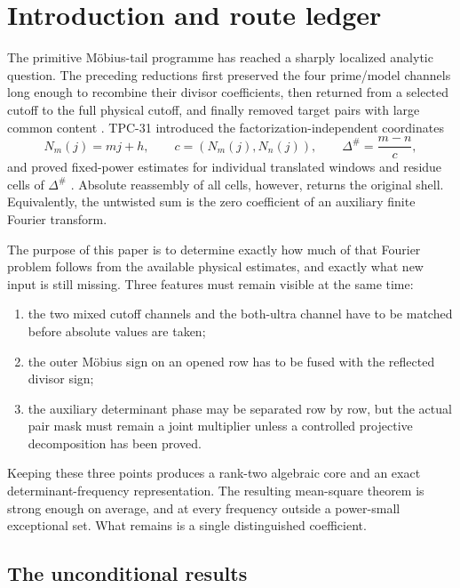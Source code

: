 \section{Introduction and route ledger}
\label{sec:tpc32-introduction}

The primitive M\"obius-tail programme has reached a sharply localized
analytic question.  The preceding reductions first preserved the four
prime/model channels long enough to recombine their divisor coefficients,
then returned from a selected cutoff to the full physical cutoff, and
finally removed target pairs with large common content
\citep{WangTPC19,WangTPC20,WangTPC25,WangTPC29,WangTPC30}.  TPC-31
introduced the factorization-independent coordinates
\begin{equation}
 N_m(j)=mj+h,
 \qquad
 c=(N_m(j),N_n(j)),
 \qquad
 \Delta^\#=\frac{m-n}{c},
 \label{eq:tpc32-intro-canonical}
\end{equation}
and proved fixed-power estimates for individual translated windows and
residue cells of $\Delta^\#$ \citep{WangTPC31}.  Absolute reassembly of all
cells, however, returns the original shell.  Equivalently, the untwisted
sum is the zero coefficient of an auxiliary finite Fourier transform.

The purpose of this paper is to determine exactly how much of that Fourier
problem follows from the available physical estimates, and exactly what
new input is still missing.  Three features must remain visible at the
same time:
\begin{enumerate}[label=\textup{(\roman*)}]
 \item the two mixed cutoff channels and the both-ultra channel have to be
 matched before absolute values are taken;
 \item the outer M\"obius sign on an opened row has to be fused with the
 reflected divisor sign;
 \item the auxiliary determinant phase may be separated row by row, but
 the actual pair mask must remain a joint multiplier unless a controlled
 projective decomposition has been proved.
\end{enumerate}
Keeping these three points produces a rank-two algebraic core and an exact
determinant-frequency representation.  The resulting mean-square theorem
is strong enough on average, and at every frequency outside a power-small
exceptional set.  What remains is a single distinguished coefficient.

\subsection{The unconditional results}

